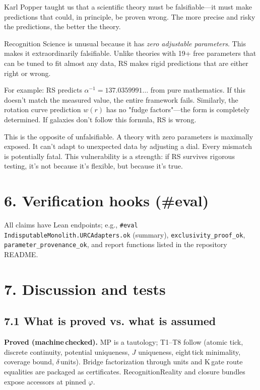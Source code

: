 \documentclass[11pt]{article}
\begin{document}
\begin{explanationbox}
Karl Popper taught us that a scientific theory must be falsifiable—it must make predictions that could, in principle, be proven wrong. The more precise and risky the predictions, the better the theory.

Recognition Science is unusual because it has \textit{zero adjustable parameters}. This makes it extraordinarily falsifiable. Unlike theories with 19+ free parameters that can be tuned to fit almost any data, RS makes rigid predictions that are either right or wrong.

For example: RS predicts $\alpha^{-1}=137.0359991\ldots$ from pure mathematics. If this doesn't match the measured value, the entire framework fails. Similarly, the rotation curve prediction $w(r)$ has no "fudge factors"—the form is completely determined. If galaxies don't follow this formula, RS is wrong.

This is the opposite of unfalsifiable. A theory with zero parameters is maximally exposed. It can't adapt to unexpected data by adjusting a dial. Every mismatch is potentially fatal. This vulnerability is a strength: if RS survives rigorous testing, it's not because it's flexible, but because it's true.
\end{explanationbox}

\section*{6. Verification hooks (#eval)}
All claims have Lean endpoints; e.g., \texttt{#eval IndisputableMonolith.URCAdapters.ok} (summary), \texttt{exclusivity\_proof\_ok}, \texttt{parameter\_provenance\_ok}, and report functions listed in the repository README.

\section*{7. Discussion and tests}
\subsection*{7.1 What is proved vs. what is assumed}
\textbf{Proved (machine\,checked).} MP is a tautology; T1--T8 follow (atomic tick, discrete continuity, potential uniqueness, $J$ uniqueness, eight\,tick minimality, coverage bound, $\delta$\,units). Bridge factorization through units and K\,gate route equalities are packaged as certificates. RecognitionReality and closure bundles expose accessors at pinned $\varphi$.
\end{document}
